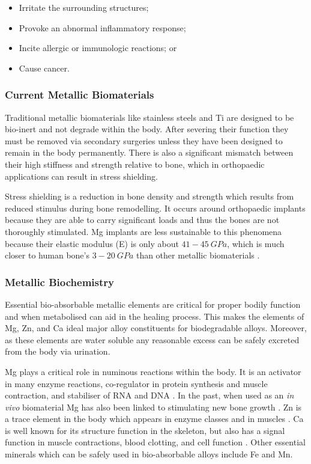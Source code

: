 \documentclass[a4paper,12pt,oneside]{report}%
\begin{document}
\begin{itemize}
	\item Irritate the surrounding structures;
	\item Provoke an abnormal inflammatory response;
	\item Incite allergic or immunologic reactions; or
	\item Cause cancer. 
\end{itemize}

\subsubsection{Current Metallic Biomaterials}
Traditional metallic biomaterials like stainless steels and Ti are designed to be bio-inert and not degrade within the body. After severing their function they must be removed via secondary surgeries unless they have been designed to remain in the body permanently. There is also a significant mismatch between their high stiffness and strength relative to bone, which in orthopaedic applications can result in stress shielding.

Stress shielding is a reduction in bone density and strength which results from reduced stimulus during bone remodelling. It occurs around orthopaedic implants because they are able to carry significant loads and thus the bones are not thoroughly stimulated. Mg implants are less sustainable to this phenomena because their elastic modulus (E) is only about $41 - 45~ GPa$, which is much closer to human bone's $3 - 20~ GPa$ than other metallic biomaterials \cite{Wang2012, Zberg2009}.

\subsubsection{Metallic Biochemistry}
Essential bio-absorbable metallic elements are critical for proper bodily function and when metabolised can aid in the healing process. This makes the elements of Mg, Zn, and Ca ideal major alloy constituents for biodegradable alloys. Moreover, as these elements are water soluble any reasonable excess can be safely excreted from the body via urination.

Mg plays a critical role in numinous reactions within the body. It is an activator in many enzyme reactions, co-regulator in protein synthesis and muscle contraction, and stabiliser of RNA and DNA \cite{Zheng2014} . In the past, when used as an \textit{in vivo} biomaterial Mg has also been linked to stimulating new bone growth \cite{Witte2010}.  Zn is a trace element in the body which appears in enzyme classes and in muscles \cite{Zheng2014}.  Ca is well known for its structure function in the skeleton, but also has a signal function in muscle contractions, blood clotting, and cell function \cite{Zheng2014}. Other essential minerals which can be safely used in bio-absorbable alloys include Fe and Mn.
\end{document}
